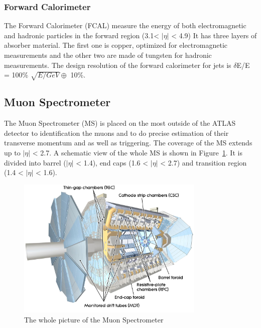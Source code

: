 \subsubsection{Forward Calorimeter}
The Forward Calorimeter (FCAL) measure the energy of both electromagnetic and hadronic particles in the forward region (3.1< $|\eta|$ < 4.9)
It has three layers of absorber material. The first one is copper, optimized for electromagnetic measurements and the other two are made of tungsten for hadronic measurements. 
The design resolution of the forward calorimeter for jets is $\delta$E/E = 100\% $\sqrt{E/GeV} \oplus$ 10\%.

\subsection{Muon Spectrometer}
The Muon Spectrometer (MS) is placed on the most outside of the ATLAS detector to identification the muons and to do precise estimation of their transverse momentum and as well as triggering.
The coverage of the MS extends up to $|\eta|$ < 2.7. A schematic view of the whole MS is shown in Figure~\ref{fig:MS}.
It is divided into  barrel ($|\eta|$ < 1.4), end caps (1.6 < $|\eta|$ < 2.7) and
transition region (1.4 < $|\eta|$ < 1.6).

\begin{figure}[tbp]
\begin{center}
 \includegraphics[width=0.8\textwidth,keepaspectratio]{figures/detector/MS}
\caption{
The whole picture of the Muon Spectrometer
}
\label{fig:MS}
\end{center}
\end{figure}

